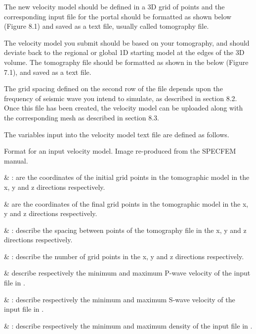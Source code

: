 \documentclass[english]{book}
\begin{document}
The new velocity model should be defined in a 3D grid of points and the
corresponding input file for the portal should be formatted as shown
below (Figure 8.1) and saved as a text file, usually called tomography
file.

The velocity model you submit should be based on your tomography, and
should deviate back to the regional or global 1D starting model at the
edges of the 3D volume. The tomography file should be formatted as shown
in the below (Figure 7.1), and saved as a text file.

The grid spacing defined on the second row of the file depends upon the
frequency of seismic wave you intend to simulate, as described in
section 8.2. Once this file has been created, the velocity model can be
uploaded along with the corresponding mesh as described in section 8.3.

The variables input into the velocity model text file are defined as
follows.


 Format for an input velocity model. Image re-produced
from the SPECFEM manual.

 \& : are the coordinates of the initial
grid points in the tomographic model in the x, y and z directions
respectively.

 \&  are the coordinates of the final grid
points in the tomographic model in the x, y and z directions
respectively.

 \& : describe the spacing
between points of the tomography file in the x, y and z directions
respectively.

 \& : describe the number of grid points in the x, y and
z directions respectively.

 \&  describe respectively the minimum and maximum
P-wave velocity of the input file in .

 \& : describe respectively the minimum and maximum
S-wave velocity of the input file in .

 \& : describe respectively the minimum and
maximum density of the input file in .
\end{document}
